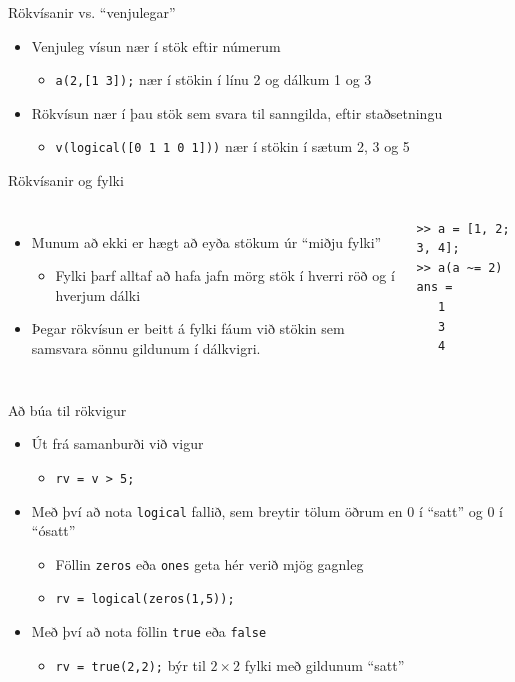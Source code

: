 \documentclass[handout]{beamer}
\begin{document}
\begin{frame}{Rökvísanir vs. ``venjulegar''}
\begin{itemize}
 \item Venjuleg vísun nær í stök eftir númerum
 \begin{itemize}
  \item \texttt{a(2,[1 3]);} nær í stökin í línu 2 og dálkum 1 og 3
 \end{itemize}
 \item Rökvísun nær í þau stök sem svara til sanngilda, eftir staðsetningu
 \begin{itemize}
  \item \texttt{v(logical([0 1 1 0 1]))} nær í stökin í sætum 2, 3 og 5
 \end{itemize}
\end{itemize}
\end{frame}

\begin{frame}[fragile]{Rökvísanir og fylki}
\begin{columns}
\begin{itemize}
 \item Munum að ekki er hægt að eyða stökum úr ``miðju fylki''
 \begin{itemize}
  \item Fylki þarf alltaf að hafa jafn mörg stök í hverri röð og í hverjum dálki
 \end{itemize}
 \item Þegar rökvísun er beitt á fylki fáum við stökin sem samsvara sönnu gildunum í dálkvigri.
\end{itemize}
\begin{verbatim}
>> a = [1, 2; 3, 4];
>> a(a ~= 2)
ans =
   1
   3
   4
\end{verbatim}
\end{columns}
\end{frame}

\begin{frame}{Að búa til rökvigur}
\begin{itemize}
 \item Út frá samanburði við vigur
 \begin{itemize}
  \item \texttt{rv = v > 5;}
 \end{itemize}
 \item Með því að nota \texttt{logical} fallið, sem breytir tölum öðrum en 0 í ``satt'' og 0 í ``ósatt''
 \begin{itemize}
  \item Föllin \texttt{zeros} eða \texttt{ones} geta hér verið mjög gagnleg
  \item \texttt{rv = logical(zeros(1,5));}
 \end{itemize}
 \item Með því að nota föllin \texttt{true} eða \texttt{false}
 \begin{itemize}
  \item \texttt{rv = true(2,2);} býr til $2 \times 2$ fylki með gildunum ``satt''
 \end{itemize}
\end{itemize}
\end{frame}
\end{document}

